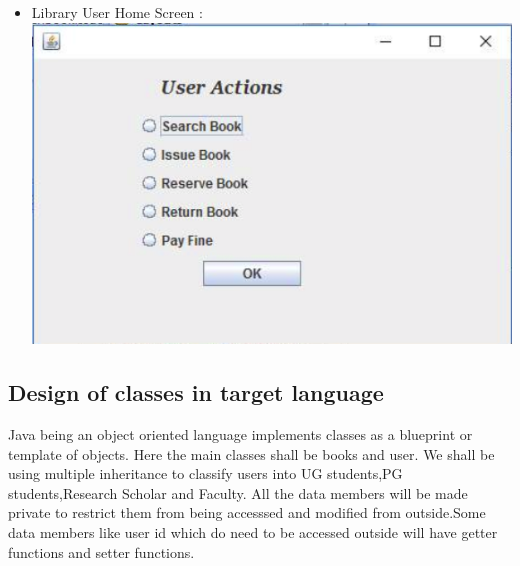 \documentclass[a4paper]{article}
\begin{document}
\begin{itemize}
\item Library User Home Screen : \\
\includegraphics[scale=0.5]{images/user.png}
\end{itemize}

\subsection{Design of classes in target language}
Java being an object oriented language implements classes  as a blueprint or template of objects. Here the main classes shall be books and user.
We shall be using multiple inheritance to classify users into UG students,PG students,Research Scholar and Faculty.
All the data members will be made private to restrict them from being accesssed and modified from outside.Some data members like user id which do need to be accessed outside will have getter functions and setter functions. 
\end{document}

